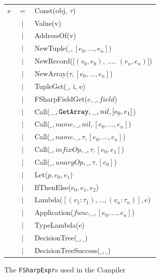 \begin{figure}
  \centering
  \begin{tabular}{@{}l c l}%
e & $=$ &   Const(obj, $\tau$) \\
 & $\vert$ &   Value(v) \\
 & $\vert$ &   AddressOf(v) \\
 & $\vert$ &   NewTuple($\_, [e_0,...,e_n]$) \\
 & $\vert$ &   NewRecord([$(v_0 , e_0),~\ldots,~(v_n , e_n)$]) \\
 & $\vert$ &   NewArray($\tau, [e_0,...,e_n]$) \\
 & $\vert$ &   TupleGet($\_$, i, e) \\
 & $\vert$ &   FSharpFieldGet($e, \_, field$) \\
 & $\vert$ &     Call($\_, \text{\ttfamily GetArray}, \_, nil, [e_0, e_1]$) \\
 & $\vert$ &     Call($\_, name, \_, nil, [e_0, \ldots, e_n]$) \\
 & $\vert$ &     Call($\_, name, \_, \tau, [e_0, \ldots, e_n]$) \\
 & $\vert$ &     Call($\_, infixOp, \_, \tau, [e_0, e_1]$) \\
 & $\vert$ &     Call($\_, unaryOp, \_, \tau, [e_0]$) \\
 & $\vert$ &   Let($p, e_0, e_1$) \\
 & $\vert$ &   IfThenElse($e_0, e_1, e_2$) \\
 & $\vert$ &   Lambda($[(v_1 : \tau_1), \ldots,(v_n : \tau_n)] , e$) \\
 & $\vert$ &   Application($func, \_, [e_0, \ldots, e_n]$) \\
 & $\vert$ &   TypeLambda(e) \\
 & $\vert$ &   DecisionTree($\_, \_$) \\
 & $\vert$ &   DecisionTreeSuccess($\_, \_$) \\
\end{tabular}
\caption{The \texttt{FSharpExpr}s used in the \fshark{}Compiler}
\label{fig:fsharpexprs1}
\end{figure}

